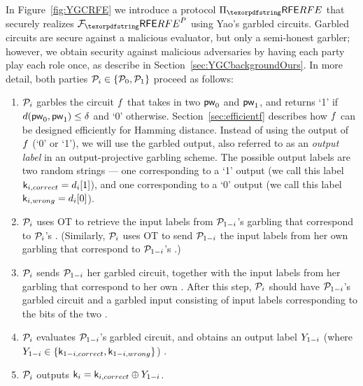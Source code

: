 
In Figure~\ref{fig:YGCRFE} we introduce a protocol $\Prfe$ that securely realizes $\Frfe^{P}$ using Yao's garbled circuits.
Garbled circuits are secure against a malicious evaluator, but only a semi-honest garbler; however, we obtain security against malicious adversaries by having each party play each role once, as describe in Section~\ref{sec:YGCbackgroundOurs}.
In more detail, both parties $\mathcal{P}_{i} \in \{\mathcal{P}_{0}, \mathcal{P}_{1}\}$ proceed as follows:

\begin{enumerate}
\item 
$\mathcal{P}_{i}$ garbles the circuit $f$ that takes in two \passwords $\mathsf{pw}_{0}$ and $\mathsf{pw}_{1}$, and returns `1' if $d(\mathsf{pw}_{0}, \mathsf{pw}_{1}) \leq \delta$ and `0' otherwise.
Section~\ref{sec:efficientf} describes how $f$ can be designed efficiently for Hamming distance. 
Instead of using the output of $f$ (`0' or `1'), we will use the garbled output, also referred to as an \emph{output label} in an output-projective garbling scheme.
The possible output labels are two random strings --- one corresponding to a `1' output (we call this label $\mathsf{k}_{i, correct} = d_{i}[1]$), and one corresponding to a `0' output (we call this label $\mathsf{k}_{i, wrong} = d_{i}[0]$).
\item
$\mathcal{P}_{i}$ uses OT to retrieve the input labels from $\mathcal{P}_{1-i}$'s garbling that correspond to $\mathcal{P}_{i}$'s \password.
(Similarly, $\mathcal{P}_{i}$ uses OT to send $\mathcal{P}_{1-i}$ the input labels from her own garbling that correspond to $\mathcal{P}_{1-i}$'s \password.)
\item 
$\mathcal{P}_{i}$ sends $\mathcal{P}_{1-i}$ her garbled circuit, together with the input labels from her garbling that correspond to her own \password.
After this step, $\mathcal{P}_{i}$ should have $\mathcal{P}_{1-i}$'s garbled circuit and a garbled input consisting of input labels corresponding to the bits of the two \passwords.
\item 
$\mathcal{P}_{i}$ evaluates $\mathcal{P}_{1-i}$'s garbled circuit, and obtains an output label $Y_{1-i}$ (where $Y_{1-i} \in \{\mathsf{k}_{1-i, correct}, \mathsf{k}_{1-i, wrong}\}$) .
\item 
$\mathcal{P}_{i}$ outputs $\mathsf{k}_{i} = \mathsf{k}_{i, correct} \oplus Y_{1-i}$.
\end{enumerate}

